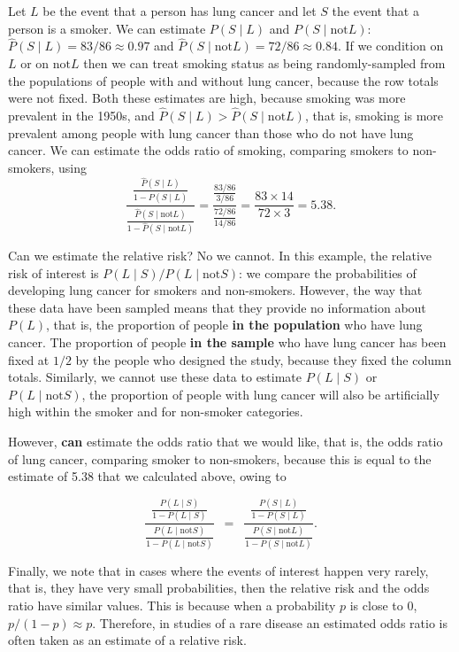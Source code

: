 \documentclass[
  british,
  11pt,
  openany, a4paper]{book}
\begin{document}
Let \(L\) be the event that a person has lung cancer and let \(S\) the event that a person is a smoker. We can estimate \(P(S \mid L)\) and \(P(S \mid \text{not}L)\): \(\hat{P}(S \mid L) = 83/86 \approx 0.97\) and \(\hat{P}(S \mid \text{not}L) = 72/86 \approx 0.84\). If we condition on \(L\) or on \(\text{not}L\) then we can treat smoking status as being randomly-sampled from the populations of people with and without lung cancer, because the row totals were not fixed. Both these estimates are high, because smoking was more prevalent in the 1950s, and \(\hat{P}(S \mid L) > \hat{P}(S \mid \text{not}L)\), that is, smoking is more prevalent among people with lung cancer than those who do not have lung cancer. We can estimate the odds ratio of smoking, comparing smokers to non-smokers, using
\[ \displaystyle\frac{\displaystyle\frac{\hat{P}(S \mid L)}{1-\hat{P}(S \mid L)}}{\displaystyle\frac{\hat{P}(S \mid \text{not}L)}{1-\hat{P}(S \mid \text{not}L)}}
= \displaystyle\frac{\displaystyle\frac{83/86}{3/86}}{\displaystyle\frac{72/86}{14/86}}
= \frac{83 \times 14}{72 \times 3} = 5.38. \]

Can we estimate the relative risk? No we cannot. In this example, the relative risk of interest is \(P(L \mid S) / P(L \mid \text{not}S)\): we compare the probabilities of developing lung cancer for smokers and non-smokers. However, the way that these data have been sampled means that they provide no information about \(P(L)\), that is, the proportion of people \textbf{in the population} who have lung cancer. The proportion of people \textbf{in the sample} who have lung cancer has been fixed at \(1/2\) by the people who designed the study, because they fixed the column totals. Similarly, we cannot use these data to estimate \(P(L \mid S)\) or \(P(L \mid \text{not}S)\), the proportion of people with lung cancer will also be artificially high within the smoker and for non-smoker categories.

However, \textbf{can} estimate the odds ratio that we would like, that is, the odds ratio of lung cancer, comparing smoker to non-smokers, because this is equal to the estimate of 5.38 that we calculated above, owing to

\[ \displaystyle\frac{\displaystyle\frac{P(L \mid S)}{1-P(L \mid S)}}{\displaystyle\frac{P(L \mid \text{not}S)}{1-P(L \mid \text{not}S)}} 
\,\,\,=\,\,\, \frac{\displaystyle\frac{P(S \mid L)}{1-P(S \mid L)}}{\displaystyle\frac{P(S \mid \text{not}L)}{1-P(S \mid \text{not}L)}}. \]

Finally, we note that in cases where the events of interest happen very rarely, that is, they have very small probabilities, then the relative risk and the odds ratio have similar values. This is because when a probability \(p\) is close to \(0\), \(p/(1-p) \approx p\). Therefore, in studies of a rare disease an estimated odds ratio is often taken as an estimate of a relative risk.
\end{document}

